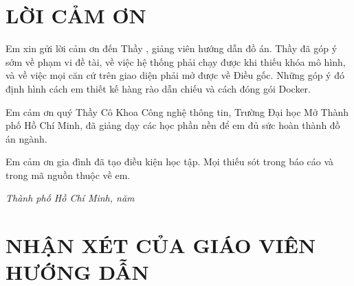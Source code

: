 \chapter*{LỜI CẢM ƠN}

Em xin gửi lời cảm ơn đến Thầy \gvhd{}, giảng viên hướng dẫn đồ án. Thầy đã
góp ý sớm về phạm vi đề tài, về việc hệ thống phải chạy được khi thiếu khóa mô
hình, và về việc mọi căn cứ trên giao diện phải mở được về Điều gốc. Những góp
ý đó định hình cách em thiết kế hàng rào dẫn chiếu và cách đóng gói Docker.

Em cảm ơn quý Thầy Cô Khoa Công nghệ thông tin, Trường Đại học Mở Thành phố Hồ
Chí Minh, đã giảng dạy các học phần nền để em đủ sức hoàn thành đồ án ngành.

Em cảm ơn gia đình đã tạo điều kiện học tập. Mọi thiếu sót trong báo cáo và
trong mã nguồn thuộc về em.

\begin{flushright}
\textit{Thành phố Hồ Chí Minh, năm \namBaoCao}\\[0.6em]
\textit{\tenSV}
\end{flushright}

\clearpage

\chapter*{NHẬN XÉT CỦA GIÁO VIÊN HƯỚNG DẪN}

\vspace{0.8cm}
\noindent\makebox[\linewidth]{\dotfill}

\vspace{0.85cm}
\noindent\makebox[\linewidth]{\dotfill}

\vspace{0.85cm}
\noindent\makebox[\linewidth]{\dotfill}

\vspace{0.85cm}
\noindent\makebox[\linewidth]{\dotfill}

\vspace{0.85cm}
\noindent\makebox[\linewidth]{\dotfill}

\vspace{0.85cm}
\noindent\makebox[\linewidth]{\dotfill}

\vspace{0.85cm}
\noindent\makebox[\linewidth]{\dotfill}

